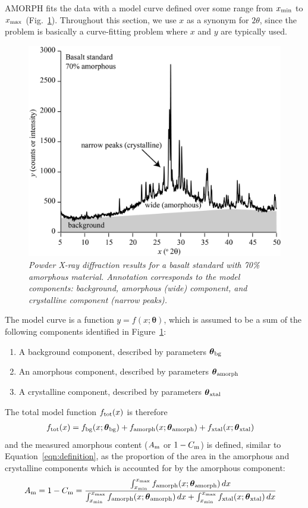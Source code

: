 \documentclass[review]{elsarticle}
\newcommand{\params}{\boldsymbol{\theta}}
\newcommand{\x}{x}
\begin{document}
AMORPH fits the data with a model curve defined over some range from
$x_{\rm min}$ to $x_{\rm max}$ (Fig.~\ref{fig:example_data2}). Throughout this section, we use
$x$ as a synonym for $2\theta$, since the problem is basically a curve-fitting
problem where $x$ and $y$ are typically used.

\begin{figure}[!ht]
\centering
\includegraphics[width=.7\textwidth]{figures/example_data2.jpg}
\caption{\it Powder X-ray diffraction results for a basalt standard with 70\% amorphous material. Annotation corresponds to the model components: background, amorphous (wide) component, and crystalline component (narrow peaks).\label{fig:example_data2}}
\end{figure}

The model curve is a function $y = f(\x; \params)$,
which is assumed to be a sum of the following components identified in Figure~\ref{fig:example_data2}:
\begin{enumerate}
\item A background component, described by parameters $\params_{\rm bg}$
\item An amorphous component, described by parameters $\params_{\rm amorph}$
\item A crystalline component, described by parameters $\params_{\rm xtal}$
\end{enumerate}
The total model function $f_{\rm tot}(x)$ is therefore
\begin{align}
f_{\rm tot}(\x) &= f_{\rm bg}(\x; \params_{\rm bg})
       + f_{\rm amorph}(\x; \params_{\rm amorph})
       + f_{\rm xtal}(\x; \params_{\rm xtal})
\end{align}
and the measured amorphous content ($A_{\rm m}$ or $1-C_{\rm m}$) is defined,
similar to Equation~\ref{eqn:definition}, as the proportion of the area in the
amorphous and crystalline components which is accounted for by the amorphous component:
\begin{align}
{A_{\rm m} = 1-C_{\rm m}} &= \frac{\int_{\x_{\rm min}}^{\x_{\rm max}}
            f_{\rm amorph}(\x; \params_{\rm amorph}) \, d\x}
          {\int_{\x_{\rm min}}^{\x_{\rm max}}
            f_{\rm amorph}(\x; \params_{\rm amorph}) \, dx
            + \int_{\x_{\rm min}}^{\x_{\rm max}} f_{\rm xtal}(\x; \params_{\rm xtal}) \, d\x} \label{eqn:crystallinity}
\end{align}
\end{document}
